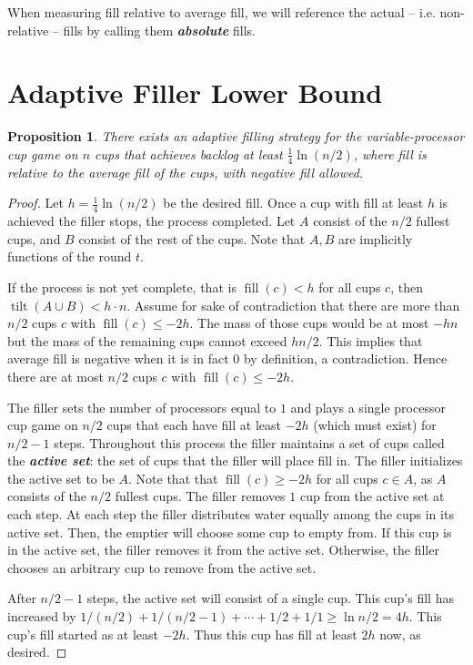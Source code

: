 \documentclass[twocolumn]{article}[10pt]
\newcommand{\defn}[1]{{\textit{\textbf{\boldmath #1}}}\xspace}
\DeclareMathOperator{\tilt}{\text{tilt}}
\DeclareMathOperator{\fil}{\text{fill}}
\newtheorem{proposition}{Proposition}
\begin{document}
When measuring fill relative to average fill, we will reference the actual --
i.e. non-relative -- fills by calling them \defn{absolute} fills.

\section{Adaptive Filler Lower Bound}\label{sec:adaptive}
\begin{proposition}
\label{prop:adaptiveBase}
  There exists an adaptive filling strategy for the variable-processor cup game
  on $n$ cups that achieves backlog at least $\frac{1}{4}\ln (n/2)$, where fill
  is relative to the average fill of the cups, with negative fill allowed.
\end{proposition}
\begin{proof}
  Let $h = \frac{1}{4}\ln (n/2)$ be the desired fill. Once a cup with fill at
  least $h$ is achieved the filler stops, the process completed.  
  Let $A$ consist of the $n/2$ fullest cups, and $B$ consist of the rest of the
  cups. Note that $A, B$ are implicitly functions of the round $t$.

  If the process is not yet complete, that is $\fil(c) < h$ for all cups $c$,
  then $\tilt(A\cup B) < h\cdot n$. Assume for sake of contradiction that there
  are more than $n/2$ cups $c$ with $\fil(c) \le -2h$. The mass of those cups
  would be at most $-hn$ but the mass of the remaining cups cannot exceed
  $hn/2$. This implies that average fill is negative when it is in fact $0$ by
  definition, a contradiction. Hence there are at most $n/2$ cups $c$ with
  $\fil(c) \le -2h$. 

  The filler sets the number of processors equal to $1$ and plays a single
  processor cup game on $n/2$ cups that each have fill at least $-2h$ (which
  must exist) for $n/2 -1$ steps. Throughout this process the filler maintains
  a set of cups called the \defn{active set}: the set of cups that the filler
  will place fill in. The filler initializes the active set to be $A$. Note
  that that $\fil(c) \ge -2h$ for all cups $c\in A$, as $A$ consists of the
  $n/2$ fullest cups. The filler removes $1$ cup from the active set at each
  step. At each step the filler distributes water equally among the cups in its
  active set. Then, the emptier will choose some cup to empty from. If this cup
  is in the active set, the filler removes it from the active set. Otherwise,
  the filler chooses an arbitrary cup to remove from the active set.

  After $n/2-1$ steps, the active set will consist of a single cup. This cup's
  fill has increased by $1/(n/2) + 1/(n/2 - 1) + \cdots + 1/2 + 1/1 \ge \ln n/2
  = 4h$. This cup's fill started as at least $-2h$. Thus this cup has fill at
  least $2h$ now, as desired.
\end{proof}
\end{document}
